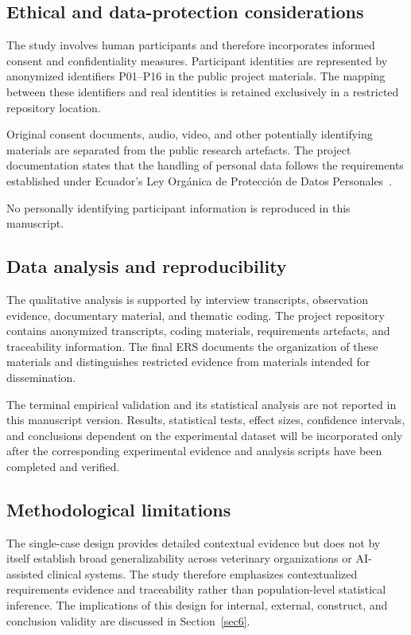 \documentclass[pdflatex,sn-mathphys-num,Numbered]{sn-jnl}
\begin{document}
\subsection{Ethical and data-protection considerations}\label{subsec7}

The study involves human participants and therefore incorporates informed consent and confidentiality measures. Participant identities are represented by anonymized identifiers P01--P16 in the public project materials. The mapping between these identifiers and real identities is retained exclusively in a restricted repository location.

Original consent documents, audio, video, and other potentially identifying materials are separated from the public research artefacts. The project documentation states that the handling of personal data follows the requirements established under Ecuador's Ley Orgánica de Protección de Datos Personales~\cite{lopdp2021}.

No personally identifying participant information is reproduced in this manuscript.

\subsection{Data analysis and reproducibility}\label{subsec8}

The qualitative analysis is supported by interview transcripts, observation evidence, documentary material, and thematic coding. The project repository contains anonymized transcripts, coding materials, requirements artefacts, and traceability information. The final ERS documents the organization of these materials and distinguishes restricted evidence from materials intended for dissemination.

The terminal empirical validation and its statistical analysis are not reported in this manuscript version. Results, statistical tests, effect sizes, confidence intervals, and conclusions dependent on the experimental dataset will be incorporated only after the corresponding experimental evidence and analysis scripts have been completed and verified.

\subsection{Methodological limitations}\label{subsec9}

The single-case design provides detailed contextual evidence but does not by itself establish broad generalizability across veterinary organizations or AI-assisted clinical systems. The study therefore emphasizes contextualized requirements evidence and traceability rather than population-level statistical inference. The implications of this design for internal, external, construct, and conclusion validity are discussed in Section~\ref{sec6}.
\end{document}
